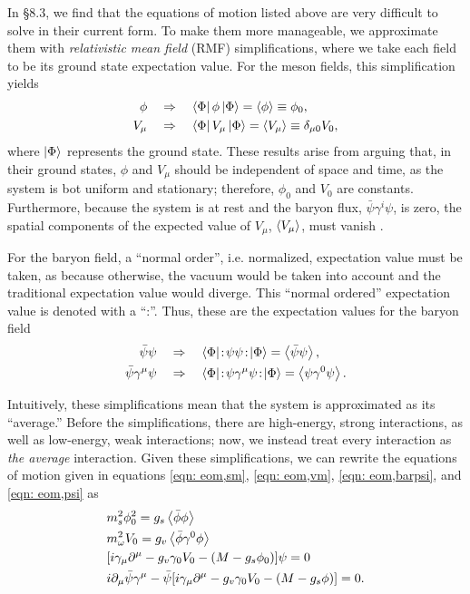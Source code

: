 In \autocite{diener_2008} \S 8.3, we find that the equations of motion listed above are very difficult to solve in their current form. To make them more manageable, we approximate them with \textit{relativistic mean field} (RMF) simplifications, where we take each field to be its ground state expectation value. For the meson fields, this simplification yields
\begin{align}
    \phi &\quad\Rightarrow\quad \bra{\Phi} \phi \ket{\Phi} = \expval{\phi} \equiv \phi_0, \\
    V_\mu & \quad\Rightarrow\quad \bra{\Phi} V_\mu \ket{\Phi} = \expval{V_\mu} \equiv \delta_{\mu 0} V_0,
\end{align}
where $\ket{\Phi}$ represents the ground state. These results arise from arguing that, in their ground states, $\phi$ and $V_\mu$ should be independent of space and time, as the system is bot uniform and stationary; therefore, $\phi_0$ and $V_0$ are constants. Furthermore, because the system is at rest and the baryon flux, $\bar\psi\gamma^i\psi$, is zero, the spatial components of the expected value of $V_\mu$, $\expval{V_\mu}$, must vanish \autocite{diener_2008}. 

For the baryon field, a ``normal order'', i.e. normalized, expectation value must be taken, as because otherwise, the vacuum would be taken into account and the traditional expectation value would diverge. This ``normal ordered'' expectation value is denoted with a ``:''. Thus, these are the expectation values for the baryon field
\begin{align}
    \bar\psi\psi &\goesto \bra{\Phi}\!:\!\psi\psi\!:\!\ket{\Phi} = \expval{\bar\psi\psi},\\
    \bar\psi\gamma^\mu \psi &\goesto \bra{\Phi}\!:\!\psi\gamma^\mu\psi\!:\!\ket{\Phi} = \expval{\psi\gamma^0\psi}.
\end{align}

Intuitively, these simplifications mean that the system is approximated as its ``average.'' Before the simplifications, there are high-energy, strong interactions, as well as low-energy, weak interactions; now, we instead treat every interaction as \textit{the average} interaction. Given these simplifications, we can rewrite the equations of motion given in equations \eqref{eqn: eom,sm}, \eqref{eqn: eom,vm}, \eqref{eqn: eom,barpsi}, and \eqref{eqn: eom,psi} as
\begin{align}
    & m_s^2 \phi_0^2 = g_s\expval{\bar\phi\phi}\label{eqn: qhd1, expval phi0 eom}\\
    & m_\omega^2 V_0 = g_v\expval{\bar\phi\gamma^0\phi}\label{eqn: qhd1, expval V0 eom}\\
    & \bqty{i\gamma_\mu\p^\mu - g_v\gamma_0 V_0 - (M - g_s\phi_0)}\psi = 0\\
    & i \p_\mu \bar\psi \gamma^\mu -\bar\psi\bqty{i\gamma_\mu\p^\mu - g_v \gamma_0V_0 - (M-g_s\phi)} = 0.
\end{align}

